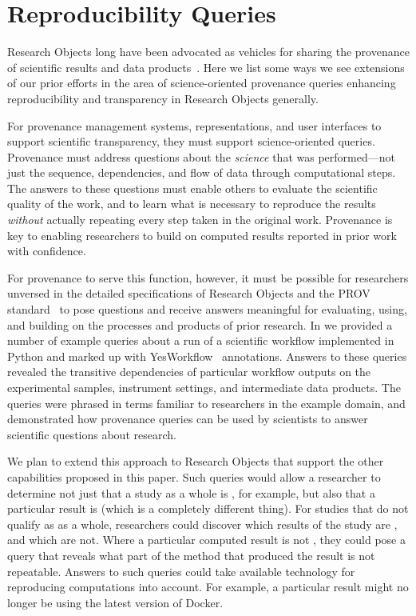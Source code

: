 \section{Reproducibility Queries}\label{sec-transparency}

Research Objects long have been advocated as vehicles for sharing the
	provenance of scientific results and data products~\cite{bechhofer2013whya}.
Here we list some ways we see extensions of our prior efforts in the area
	of science-oriented provenance queries
    enhancing reproducibility and transparency in
	Research Objects generally.

For provenance management systems, representations, and user interfaces to support
	scientific transparency, they must support science-oriented queries.
Provenance must address questions about the \emph{science} that was performed---not just the
	sequence, dependencies, and flow of data through computational steps.
The answers to these questions must enable others to evaluate the scientific quality of the work,
	and to learn what is necessary to
	reproduce the results \emph{without} actually repeating every step taken in the original work.
Provenance is key to enabling researchers to build on computed results reported in prior work with confidence.

For provenance to serve this function, however, it must be possible for researchers unversed in the detailed
	specifications of Research Objects and the PROV standard~\cite{groth2013provoverviewa} to pose
	questions and receive answers meaningful for evaluating, using, and building on the
	processes and products of prior research.
In \cite{mcphillips2015retrospective} we provided a number of example queries about a run of a scientific
	workflow implemented in Python and marked up with YesWorkflow~\cite{mcphillips2015yesworkflowa} annotations.
Answers to these queries revealed the transitive dependencies of particular workflow outputs
	on the experimental samples, instrument settings, and intermediate data products.
The queries were phrased in terms familiar to researchers in the example domain,
	and demonstrated how provenance queries can be used by scientists
	to answer scientific questions about research.

We plan to extend this approach to Research Objects that support the other capabilities
	proposed in this paper.
Such queries would allow a researcher to determine not just that a study as a whole
	is , for example, but also that a particular result
	is  (which is a completely different thing).
For studies that do not qualify as  as a whole, researchers
	could discover which results of the study are , and which are not.
Where a particular computed result is not , they could pose a query
	that reveals what part of the method that produced the result is
	not repeatable.
Answers to such queries could take available technology for reproducing computations
	into account.
For example, a particular result might no longer be  using the
	latest version of Docker.
